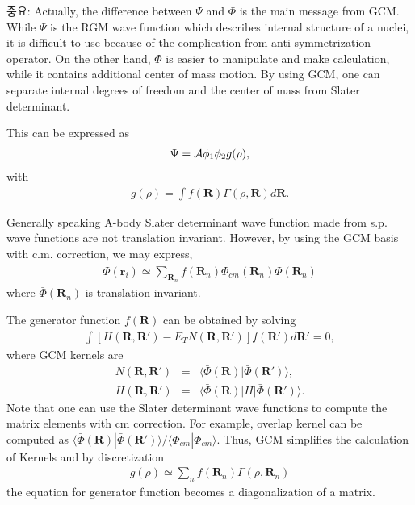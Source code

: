 \documentclass[11pt]{article}
\def\bm{\boldsymbol}
\newcommand{\bea}{\begin{eqnarray}}
\newcommand{\eea}{\end{eqnarray}}
\newcommand{\no}{\nonumber \\}
\newcommand{\vr}{{\bm r}}
\newcommand{\vR}{{\bm R}}
\newcommand{\la}{\langle}
\newcommand{\ra}{\rangle}
\begin{document}
중요: Actually, the difference between $\Psi$ and $\Phi$ is the main
message from GCM. While $\Psi$ is the RGM wave function which describes internal 
structure of a nuclei, it is difficult to use because of the complication 
from anti-symmetrization operator. On the other hand, $\Phi$ is easier to manipulate and
make calculation, while it contains additional center of mass motion. 
By using GCM, one can separate internal degrees of freedom and the center of mass
from Slater determinant. 

This can be expressed as 
\bea 
\Psi={\cal A}\phi_1 \phi_2 g(\rho),
\eea 
with 
\bea 
g(\rho)=\int f(\vR)\Gamma(\rho,\vR) d\vR. 
\eea 

Generally speaking A-body Slater determinant wave function made from s.p. wave functions are not translation invariant. 
However, by using the GCM basis with c.m. correction, 
we may express,
\bea 
\Phi(\vr_i)\simeq \sum_{\vR_n} f(\vR_n) \Phi_{cm}(\vR_n) \bar{\Phi}(\vR_n) 
\eea 
where $\bar{\Phi}(\vR_n) $ is translation invariant.

The generator function $f(\vR)$ can be obtained by solving 
\bea 
\int [H(\vR,\vR')-E_T N(\vR,\vR')]f(\vR')d\vR'=0,
\eea 
where GCM kernels are
\bea 
N(\vR,\vR')&=&\la \bar{\Phi}(\vR)|\bar{\Phi}(\vR')\ra ,\no 
H(\vR,\vR')&=&\la \bar{\Phi}(\vR)|H|\bar{\Phi}(\vR')\ra.
\eea 
Note that one can use the Slater determinant wave functions
to compute the matrix elements with cm correction.
For example, overlap kernel can be computed as
$\la \bar{\Phi}(\vR)|\bar{\Phi}(\vR')\ra/\la \Phi_{cm}|\Phi_{cm}\ra $.
Thus, GCM simplifies the calculation of Kernels
and by discretization 
\bea 
g(\rho)\simeq \sum_{n}  f(\vR_n)\Gamma(\rho,\vR_n)
\eea 
the equation for generator function becomes a diagonalization
of a matrix. 
\end{document}

